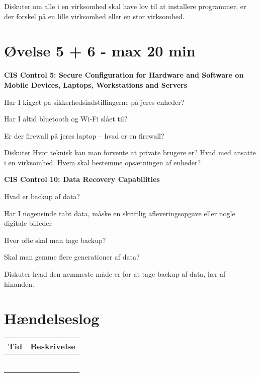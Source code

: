 \documentclass[a4paper,11pt,notitlepage,landscape]{report}
\begin{document}
Diskuter om alle i en virksomhed skal have lov til at installere programmer, er der forskel på en lille virksomhed eller en stor virksomhed.

\eject

\section*{Øvelse 5 + 6 - max 20 min}

{\bf CIS Control 5:
Secure Configuration for Hardware and Software on Mobile Devices, Laptops, Workstations and Servers}

\begin{list1}
\item[\faSquareO] Har I kigget på sikkerhedsindstillingerne på jeres enheder?
\item[\faSquareO] Har I altid bluetooth og Wi-Fi slået til?

\item[\faSquareO] Er der firewall på jeres laptop -- hvad er en firewall?
\end{list1}

Diskuter Hvor teknisk kan man forvente at private brugere er? Hvad med ansatte i en virksomhed. Hvem skal bestemme opsætningen af enheder?


{\bf CIS Control 10: Data Recovery Capabilities}

\begin{list1}
\item[\faSquareO] Hvad er backup af data?
\item[\faSquareO] Har I nogensinde tabt data, måske en skriftlig afleveringsopgave eller nogle digitale billeder
\item[\faSquareO] Hvor ofte skal man tage backup?
\item[\faSquareO] Skal man gemme flere generationer af data?
\end{list1}

Diskuter hvad den nemmeste måde er for at tage backup af data, lær af hinanden.


\eject

\section*{Hændelseslog }


\begin{tabularx}{\textwidth-1cm}{|p{3cm}|X|} \hline
Tid & Beskrivelse \\\hline
& \\\hline
& \\\hline
& \\\hline
& \\\hline
& \\\hline
& \\\hline
\end{tabularx}
\end{document}
